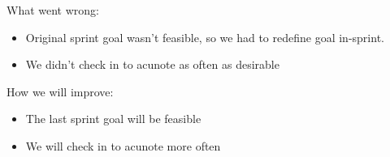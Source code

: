 \documentclass[a4paper,11pt]{article}
\begin{document}
\noindent
What went wrong:
\begin{itemize}
\item Original sprint goal wasn’t feasible, so we had to redefine goal in-sprint.
\item We didn’t check in to acunote as often as desirable
\end{itemize}

\noindent
How we will improve:
\begin{itemize}
\item The last sprint goal will be feasible
\item We will check in to acunote more often
\end{itemize}
\end{document}
